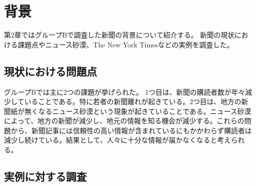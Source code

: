 \chapter{背景}
第2章ではグループBで調査した新聞の背景について紹介する。
新聞の現状における課題点やニュース砂漠、The New York Timesなどの実例を調査した。
\section{現状における問題点}
グループBでは主に2つの課題が挙げられた。
1つ目は、新聞の購読者数が年々減少していることである。特に若者の新聞離れが起きている。2つ目は、地方の新聞紙が無くなるニュース砂漠という現象が起きていることである。ニュース砂漠によって、地方の新聞が減少し、地元の情報を知る機会が減少する。これらの問題から、新聞記事には信頼性の高い情報が含まれているにもかかわらず購読者は減少し続けている。結果として、人々に十分な情報が届かなくなると考えられる。

\section{実例に対する調査}
